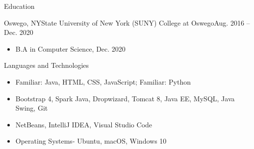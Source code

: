 \documentclass[]{johnsoncv}
\begin{document}
	\makeheader
	
	
	\begin{cvsection}{Education}
		\begin{cvsubsection}{Oswego, NY}{State University of New York (SUNY) College at Oswego}{Aug. 2016 – Dec. 2020}
			\begin{itemize}
				\item B.A in Computer Science, Dec. 2020
			\end{itemize}
		\end{cvsubsection}
	\end{cvsection}

	\begin{cvsection}{Languages and Technologies}
		\begin{cvsubsection}{}{}{}	
			\begin{itemize}
				\item Familiar: Java, HTML, CSS, JavaScript; Familiar: Python
				\item Bootstrap 4, Spark Java, Dropwizard, Tomcat 8, Java EE, MySQL, Java Swing, Git
				\item NetBeans, IntelliJ IDEA, Visual Studio Code
				\item Operating Systems- Ubuntu, macOS, Windows 10
			\end{itemize}
		\end{cvsubsection}
	\end{cvsection}

\end{document}
